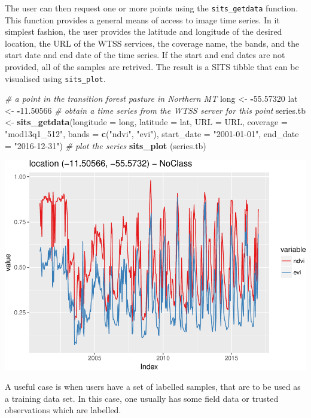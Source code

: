 \documentclass[11pt,]{article}
\newenvironment{Shaded}{\begin{snugshade}}{\end{snugshade}}
\newcommand{\KeywordTok}[1]{\textcolor[rgb]{0.13,0.29,0.53}{\textbf{#1}}}
\newcommand{\DataTypeTok}[1]{\textcolor[rgb]{0.13,0.29,0.53}{#1}}
\newcommand{\FloatTok}[1]{\textcolor[rgb]{0.00,0.00,0.81}{#1}}
\newcommand{\StringTok}[1]{\textcolor[rgb]{0.31,0.60,0.02}{#1}}
\newcommand{\CommentTok}[1]{\textcolor[rgb]{0.56,0.35,0.01}{\textit{#1}}}
\newcommand{\OperatorTok}[1]{\textcolor[rgb]{0.81,0.36,0.00}{\textbf{#1}}}
\newcommand{\NormalTok}[1]{#1}
\begin{document}
The user can then request one or more points using the
\texttt{sits\_getdata} function. This function provides a general means
of access to image time series. In it simplest fashion, the user
provides the latitude and longitude of the desired location, the URL of
the WTSS services, the coverage name, the bands, and the start date and
end date of the time series. If the start and end dates are not
provided, all of the samples are retrived. The result is a SITS tibble
that can be visualised using \texttt{sits\_plot}.

\begin{Shaded}
\begin{Highlighting}[]
\CommentTok{# a point in the transition forest pasture in Northern MT}
\NormalTok{long <-}\StringTok{ }\OperatorTok{-}\FloatTok{55.57320}
\NormalTok{lat <-}\StringTok{ }\OperatorTok{-}\FloatTok{11.50566}
\CommentTok{# obtain a time series from the WTSS server for this point}
\NormalTok{series.tb <-}\StringTok{ }\KeywordTok{sits_getdata}\NormalTok{(}\DataTypeTok{longitude =}\NormalTok{ long, }\DataTypeTok{latitude =}\NormalTok{ lat, }\DataTypeTok{URL =}\NormalTok{ URL, }
             \DataTypeTok{coverage =} \StringTok{"mod13q1_512"}\NormalTok{, }\DataTypeTok{bands =} \KeywordTok{c}\NormalTok{(}\StringTok{"ndvi"}\NormalTok{, }\StringTok{"evi"}\NormalTok{),}
             \DataTypeTok{start_date =} \StringTok{"2001-01-01"}\NormalTok{, }\DataTypeTok{end_date =} \StringTok{"2016-12-31"}\NormalTok{)}
\CommentTok{# plot the series}
\KeywordTok{sits_plot}\NormalTok{ (series.tb)}
\end{Highlighting}
\end{Shaded}

\includegraphics{sits_description_files/figure-latex/unnamed-chunk-14-1.pdf}

A useful case is when users have a set of labelled samples, that are to
be used as a training data set. In this case, one usually has some field
data or trusted observations which are labelled.
\newpage
\singlespacing

\end{document}
